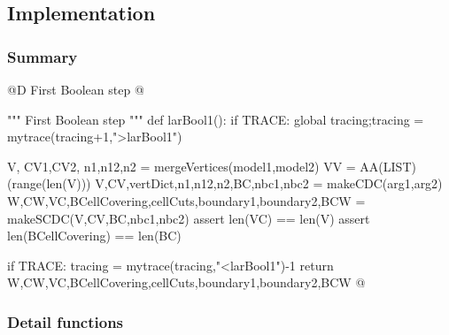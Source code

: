 \documentclass[11pt,oneside]{article}	%
\begin{document}
\subsection{Implementation}


\subsubsection{Summary}

@D First Boolean step
@{""" First Boolean step """
def larBool1():
	if TRACE: global tracing;tracing = mytrace(tracing+1,">larBool1")

	V, CV1,CV2, n1,n12,n2 = mergeVertices(model1,model2)
	VV = AA(LIST)(range(len(V)))
	V,CV,vertDict,n1,n12,n2,BC,nbc1,nbc2 = makeCDC(arg1,arg2)
	W,CW,VC,BCellCovering,cellCuts,boundary1,boundary2,BCW = makeSCDC(V,CV,BC,nbc1,nbc2)
	assert len(VC) == len(V) 
	assert len(BCellCovering) == len(BC)

	if TRACE: tracing = mytrace(tracing,"<larBool1")-1
	return W,CW,VC,BCellCovering,cellCuts,boundary1,boundary2,BCW 
@}

\subsubsection{Detail functions}
\end{document}

